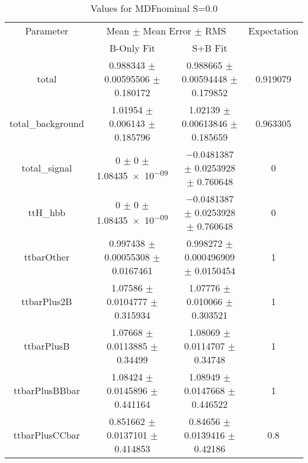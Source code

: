 \begin{table}
\centering
\caption{Values for MDFnominal S=0.0}
\begin{tabular}{cccc}
\toprule
Parameter & \multicolumn{2}{c}{Mean $\pm$ Mean Error $\pm$ RMS} & Expectation\\
 & B-Only Fit & S+B Fit & \\
\midrule
total & \num{0.988343} $\pm$ \num{0.00595506} $\pm$ \num{0.180172} & \num{0.988665} $\pm$ \num{0.00594448} $\pm$ \num{0.179852} & \num{0.919079}\\
total\_background & \num{1.01954} $\pm$ \num{0.006143} $\pm$ \num{0.185796} & \num{1.02139} $\pm$ \num{0.00613846} $\pm$ \num{0.185659} & \num{0.963305}\\
total\_signal & \num{0} $\pm$ \num{0} $\pm$ \num{1.08435e-09} & \num{-0.0481387} $\pm$ \num{0.0253928} $\pm$ \num{0.760648} & \num{0}\\
ttH\_hbb & \num{0} $\pm$ \num{0} $\pm$ \num{1.08435e-09} & \num{-0.0481387} $\pm$ \num{0.0253928} $\pm$ \num{0.760648} & \num{0}\\
ttbarOther & \num{0.997438} $\pm$ \num{0.00055308} $\pm$ \num{0.0167461} & \num{0.998272} $\pm$ \num{0.000496909} $\pm$ \num{0.0150454} & \num{1}\\
ttbarPlus2B & \num{1.07586} $\pm$ \num{0.0104777} $\pm$ \num{0.315934} & \num{1.07776} $\pm$ \num{0.010066} $\pm$ \num{0.303521} & \num{1}\\
ttbarPlusB & \num{1.07668} $\pm$ \num{0.0113885} $\pm$ \num{0.34499} & \num{1.08069} $\pm$ \num{0.0114707} $\pm$ \num{0.34748} & \num{1}\\
ttbarPlusBBbar & \num{1.08424} $\pm$ \num{0.0145896} $\pm$ \num{0.441164} & \num{1.08949} $\pm$ \num{0.0147668} $\pm$ \num{0.446522} & \num{1}\\
ttbarPlusCCbar & \num{0.851662} $\pm$ \num{0.0137101} $\pm$ \num{0.414853} & \num{0.84656} $\pm$ \num{0.0139416} $\pm$ \num{0.42186} & \num{0.8}\\
\bottomrule
\end{tabular}
\end{table}
